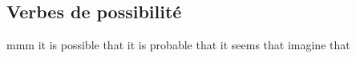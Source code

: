 
\subsection*{Verbes de possibilité}
 { }   {mmm}
   {it is possible that}
   {it is probable that}
   {it seems that}
   {imagine that}
